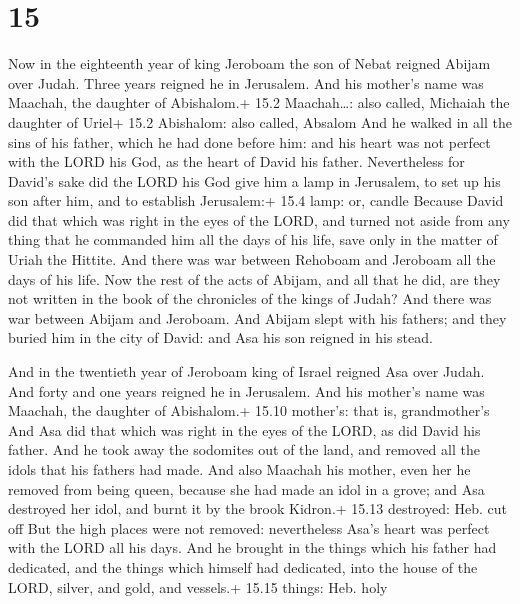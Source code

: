 \hypertarget{section-14}{%
\section{15}\label{section-14}}

 Now in the eighteenth year of king Jeroboam the son of
Nebat reigned Abijam over Judah.  Three years reigned he in
Jerusalem. And his mother's name was Maachah, the daughter of
Abishalom.+ 15.2 Maachah\ldots: also called, Michaiah the daughter of
Uriel+ 15.2 Abishalom: also called, Absalom  And he walked
in all the sins of his father, which he had done before him: and his
heart was not perfect with the LORD his God, as the heart of David his
father.  Nevertheless for David's sake did the LORD his God
give him a lamp in Jerusalem, to set up his son after him, and to
establish Jerusalem:+ 15.4 lamp: or, candle  Because David
did that which was right in the eyes of the LORD, and turned not aside
from any thing that he commanded him all the days of his life, save only
in the matter of Uriah the Hittite.  And there was war
between Rehoboam and Jeroboam all the days of his life.  Now
the rest of the acts of Abijam, and all that he did, are they not
written in the book of the chronicles of the kings of Judah? And there
was war between Abijam and Jeroboam.  And Abijam slept with
his fathers; and they buried him in the city of David: and Asa his son
reigned in his stead.

 And in the twentieth year of Jeroboam king of Israel
reigned Asa over Judah.  And forty and one years reigned he
in Jerusalem. And his mother's name was Maachah, the daughter of
Abishalom.+ 15.10 mother's: that is, grandmother's  And Asa
did that which was right in the eyes of the LORD, as did David his
father.  And he took away the sodomites out of the land,
and removed all the idols that his fathers had made.  And
also Maachah his mother, even her he removed from being queen, because
she had made an idol in a grove; and Asa destroyed her idol, and burnt
it by the brook Kidron.+ 15.13 destroyed: Heb. cut off  But
the high places were not removed: nevertheless Asa's heart was perfect
with the LORD all his days.  And he brought in the things
which his father had dedicated, and the things which himself had
dedicated, into the house of the LORD, silver, and gold, and vessels.+
15.15 things: Heb. holy

